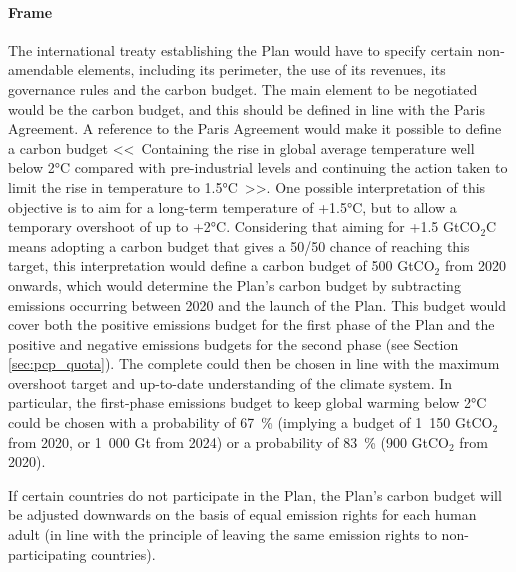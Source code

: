 \documentclass[a5paper,french,openany]{memoir}
\begin{document}
{\paragraph{Frame} %
The international treaty establishing the Plan would have to specify certain non-amendable elements, including its perimeter, the use of its revenues, its governance rules and the carbon budget. The main element to be negotiated would be the carbon budget, and this should be defined in line with the Paris Agreement. A reference to the Paris Agreement would make it possible to define a carbon budget <<~Containing the rise in global average temperature well below 2°C compared with pre-industrial levels and continuing the action taken to limit the rise in temperature to 1.5°C~>>. One possible interpretation of this objective is to aim for a long-term temperature of +1.5°C, but to allow a temporary overshoot of up to +2°C. 
Considering that aiming for +1.5 GtCO$_\text{2}$\textdegree{}C means adopting a carbon budget that gives a 50/50 chance of reaching this target, this interpretation would define a carbon budget of 500 GtCO$_\text{2}$ from 2020 onwards, 
which would determine the Plan's carbon budget by subtracting emissions occurring between 2020 and the launch of the Plan. This budget would cover both the positive emissions budget for the first phase of the Plan and the positive and negative emissions budgets for the second phase (see Section \ref{sec:pcp_quota}). 
The complete %
could then be chosen in line with the maximum overshoot target and up-to-date understanding of the climate system. 
In particular, the first-phase emissions budget to keep global warming below 2°C could be chosen with a probability of 67~\% (implying a budget of 1~150 GtCO$_\text{2}$ from 2020, or 1~000 Gt from 2024) or a probability of 83~\% (900 GtCO$_\text{2}$ from 2020). 

If certain countries do not participate in the Plan, the Plan's carbon budget will be adjusted downwards on the basis of equal emission rights for each human adult (in line with the principle of leaving the same emission rights to non-participating countries).

}
\end{document}
